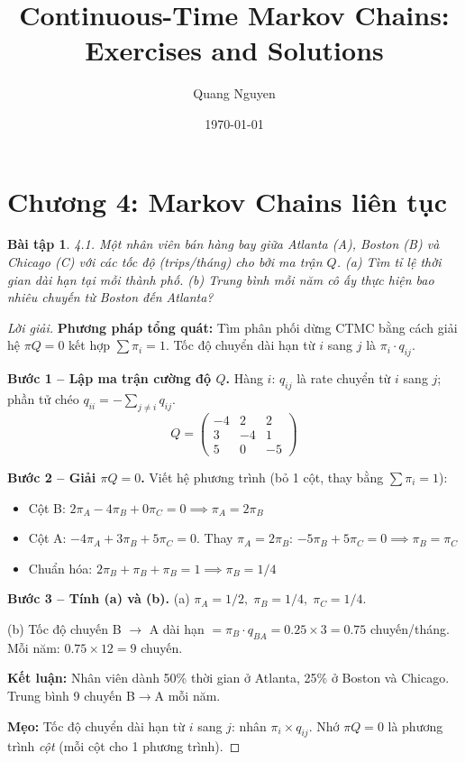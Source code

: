 \documentclass[8pt,a4paper]{article}
\title{Continuous-Time Markov Chains: Exercises and Solutions}
\author{Quang Nguyen}
\date{\today}
\newtheorem{exercise}{Bài tập}
\newenvironment{solution}{\begin{proof}[Lời giải]}{\end{proof}}
\begin{document}
\maketitle

\section*{Chương 4: Markov Chains liên tục}

\begin{exercise}
4.1. Một nhân viên bán hàng bay giữa Atlanta (A), Boston (B) và Chicago (C) với các tốc độ (trips/tháng) cho bởi ma trận $Q$.
(a) Tìm tỉ lệ thời gian dài hạn tại mỗi thành phố.
(b) Trung bình mỗi năm cô ấy thực hiện bao nhiêu chuyến từ Boston đến Atlanta?
\end{exercise}
\begin{solution}
\textbf{Phương pháp tổng quát:} Tìm phân phối dừng CTMC bằng cách giải hệ $\pi Q = 0$ kết hợp $\sum \pi_i = 1$. Tốc độ chuyển dài hạn từ $i$ sang $j$ là $\pi_i \cdot q_{ij}$.

\textbf{Bước 1 -- Lập ma trận cường độ $Q$.} Hàng $i$: $q_{ij}$ là rate chuyển từ $i$ sang $j$; phần tử chéo $q_{ii} = -\sum_{j \neq i} q_{ij}$.
\[
Q = \begin{pmatrix}
-4 & 2 & 2 \\
3 & -4 & 1 \\
5 & 0 & -5
\end{pmatrix}
\]

\textbf{Bước 2 -- Giải $\pi Q = 0$.} Viết hệ phương trình (bỏ 1 cột, thay bằng $\sum \pi_i = 1$):
\begin{itemize}[nosep]
\item Cột B: $2\pi_A - 4\pi_B + 0\pi_C = 0 \implies \pi_A = 2\pi_B$
\item Cột A: $-4\pi_A + 3\pi_B + 5\pi_C = 0$. Thay $\pi_A = 2\pi_B$: $-5\pi_B + 5\pi_C = 0 \implies \pi_B = \pi_C$
\item Chuẩn hóa: $2\pi_B + \pi_B + \pi_B = 1 \implies \pi_B = 1/4$
\end{itemize}

\textbf{Bước 3 -- Tính (a) và (b).}
(a) $\boxed{\pi_A = 1/2,\; \pi_B = 1/4,\; \pi_C = 1/4}$.

(b) Tốc độ chuyến B $\to$ A dài hạn $= \pi_B \cdot q_{BA} = 0.25 \times 3 = 0.75$ chuyến/tháng. Mỗi năm: $0.75 \times 12 = \boxed{9}$ chuyến.

\textbf{Kết luận:} Nhân viên dành 50\% thời gian ở Atlanta, 25\% ở Boston và Chicago. Trung bình 9 chuyến B$\to$A mỗi năm.

\textbf{Mẹo:} Tốc độ chuyển dài hạn từ $i$ sang $j$: nhân $\pi_i \times q_{ij}$. Nhớ $\pi Q = 0$ là phương trình \emph{cột} (mỗi cột cho 1 phương trình).
\end{solution}
\end{document}
